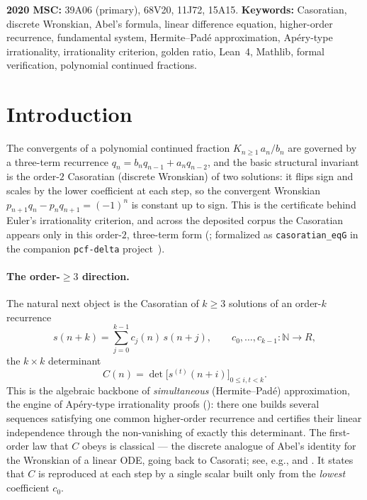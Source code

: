 \documentclass[11pt]{article}
\newcommand{\N}{\mathbb{N}}
\newcommand{\Caso}{C}
\begin{document}
\noindent\textbf{2020 MSC:} 39A06 (primary), 68V20, 11J72, 15A15.\quad
\textbf{Keywords:} Casoratian, discrete Wronskian, Abel's formula,
linear difference equation, higher-order recurrence, fundamental system,
Hermite--Pad\'e approximation, Ap\'ery-type irrationality, irrationality criterion,
golden ratio, Lean~4, Mathlib, formal verification, polynomial continued
fractions.

\section{Introduction}\label{sec:intro}

The convergents of a polynomial continued fraction $K_{n\ge1}\,a_n/b_n$ are governed
by a three-term recurrence $q_n=b_nq_{n-1}+a_nq_{n-2}$, and the basic structural
invariant is the order-$2$ Casoratian (discrete Wronskian) of two solutions: it
flips sign and scales by the lower coefficient at each step, so the convergent
Wronskian $p_{n+1}q_n-p_nq_{n+1}=(-1)^n$ is constant up to sign. This is the
certificate behind Euler's irrationality criterion, and across the deposited corpus
the Casoratian appears only in this order-$2$, three-term form
(\cite{ladder,caso2lean}; formalized as \texttt{casoratian\_eqG} in the companion
\texttt{pcf-delta} project~\cite{pcfdelta}).

\paragraph{The order-$\ge3$ direction.}
The natural next object is the Casoratian of $k\ge3$ solutions of an order-$k$
recurrence
\begin{equation}\label{eq:rec}
  s(n+k)=\sum_{j=0}^{k-1}c_j(n)\,s(n+j),
  \qquad c_0,\dots,c_{k-1}\colon\N\to R,
\end{equation}
the $k\times k$ determinant
\begin{equation}\label{eq:caso}
  \Caso(n)=\det\big[s^{(t)}(n+i)\big]_{0\le i,t<k}.
\end{equation}
This is the algebraic backbone of \emph{simultaneous} (Hermite--Pad\'e)
approximation, the engine of Ap\'ery-type irrationality proofs
(\cite{vdpoorten}): there one builds several sequences satisfying one common
higher-order recurrence and certifies their linear independence through the
non-vanishing of exactly this determinant. The first-order law that $\Caso$ obeys
is classical --- the discrete analogue of Abel's identity for the Wronskian of a
linear ODE, going back to Casorati; see, e.g., \cite[Ch.~2]{elaydi}
and \cite{kelleypeterson}. It states that $\Caso$ is reproduced at each step by a
single scalar built only from the \emph{lowest} coefficient $c_0$.
\end{document}
